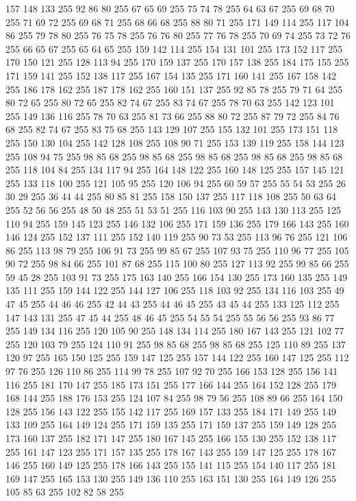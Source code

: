 157 148 133 255 92 86 80 255 67 65 69 255 75 74 78 255 64 63 67 255 69 68 70 255 71 69 72 255 69 68 71 255 68 66 68 255 88 80 71 255 171 149 114 255 117 104 86 255 79 78 80 255 76 75 78 255 76 76 80 255 77 76 78 255 70 69 74 255 73 72 76 255 66 65 67 255 65 64 65 255 159 142 114 255 154 131 101 255 173 152 117 255 170 150 121 255 128 113 94 255 170 159 137 255 170 157 138 255 184 175 155 255 171 159 141 255 152 138 117 255 167 154 135 255 171 160 141 255 167 158 142 255 186 178 162 255 187 178 162 255 160 151 137 255 92 85 78 255 79 71 64 255 80 72 65 255 80 72 65 255 82 74 67 255 83 74 67 255 78 70 63 255 142 123 101 255 149 136 116 255 78 70 63 255 81 73 66 255 88 80 72 255 87 79 72 255 84 76 68 255 82 74 67 255 83 75 68 255 143 129 107 255 155 132 101 255 173 151 118 255 150 130 104 255 142 128 108 255 108 90 71 255 153 139 119 255 158 144 123 255 108 94 75 255 98 85 68 255 98 85 68 255 98 85 68 255
98 85 68 255 98 85 68 255 118 104 84 255 134 117 94 255 164 148 122 255 160 148 125 255 157 145 121 255 133 118 100 255 121 105 95 255 120 106 94 255 60 59 57 255 55 54 53 255 26 30 29 255 36 44 44 255 80 85 81 255 158 150 137 255 117 118 108 255 50 63 64 255 52 56 56 255 48 50 48 255 51 53 51 255 116 103 90 255 143 130 113 255 125 110 94 255 159 145 123 255 146 132 106 255 171 159 136 255 179 166 143 255 160 146 124 255 152 137 111 255 152 140 119 255 90 73 53 255 113 96 76 255 121 106 86 255 113 98 79 255 106 91 73 255 99 85 67 255 107 93 75 255 110 96 77 255 105 90 72 255 98 84 66 255 101 87 68 255 115 100 80 255 127 113 92 255 99 85 66 255 59 45 28 255 103 91 73 255 175 163 140 255 166 154 130 255 173 160 135 255 149 135 111 255 159 144 122 255 144 127 106 255 118 103 92 255 134 116 103 255 49 47 45 255 44 46 46 255 42 44 43 255 44 46 45 255 43 45 44 255 133 125 112 255 147 143 131 255 47 45 44 255 48 46 45 255
54 55 54 255 55 56 56 255 93 86 77 255 149 134 116 255 120 105 90 255 148 134 114 255 180 167 143 255 121 102 77 255 120 103 79 255 124 110 91 255 98 85 68 255 98 85 68 255 125 110 89 255 137 120 97 255 165 150 125 255 159 147 125 255 157 144 122 255 160 147 125 255 112 97 76 255 126 110 86 255 114 99 78 255 107 92 70 255 166 153 128 255 156 141 116 255 181 170 147 255 185 173 151 255 177 166 144 255 164 152 128 255 179 168 144 255 188 176 153 255 124 107 84 255 98 79 56 255 108 89 66 255 164 150 128 255 156 143 122 255 155 142 117 255 169 157 133 255 184 171 149 255 149 133 109 255 164 149 124 255 171 159 135 255 171 159 137 255 159 149 128 255 173 160 137 255 182 171 147 255 180 167 145 255 166 155 130 255 152 138 117 255 161 147 123 255 171 157 135 255 178 167 143 255 159 147 125 255 178 167 146 255 160 149 125 255 178 166 143 255 155 141 115 255 154 140 117 255 181 169 147 255 165 153 130 255 149 136 110 255 163 151 130 255 164 149 126 255 105 85 63 255 102 82 58 255
